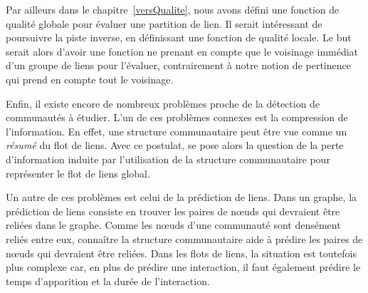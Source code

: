 Par ailleurs dans le chapitre~\ref{versQualite}, nous avons défini une fonction de qualité globale pour évaluer une partition de lien.
Il serait intéressant de poursuivre la piste inverse, en définissant une fonction de qualité locale.
Le but serait alors d'avoir une fonction ne prenant en compte que le voisinage immédiat d'un groupe de liens pour l'évaluer, contrairement à notre notion de pertinence qui prend en compte tout le voisinage.

Enfin, il existe encore de nombreux problèmes proche de la détection de communautés à étudier.
L'un de ces problèmes connexes est la compression de l'information.
En effet, une structure communautaire peut être vue comme un \emph{résumé} du flot de liens.
Avec ce postulat, se pose alors la question de la perte d'information induite par l'utilisation de la structure communautaire pour représenter le flot de liens global.

Un autre de ces problèmes est celui de la prédiction de liens.
Dans un graphe, la prédiction de liens consiste en trouver les paires de n\oe{}uds qui devraient être reliées dans le graphe.
Comme les n\oe{}uds d'une communauté sont densément reliés entre eux, connaître la structure communautaire aide à prédire les paires de n\oe{}uds qui devraient être reliées.
Dans les flots de liens, la situation est toutefois plus complexe car, en plus de prédire une interaction, il faut également prédire le temps d'apparition et la durée de l'interaction.



\bigskip

